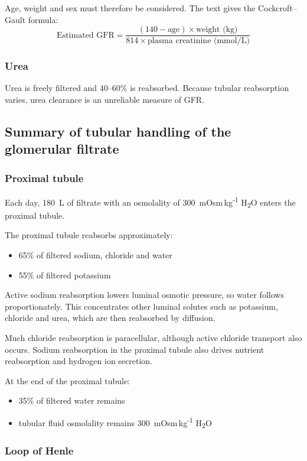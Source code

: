 \documentclass[11pt,a4paper]{article}
\begin{document}
Age, weight and sex must therefore be considered. The text gives the Cockcroft--Gault formula:
\[
\text{Estimated GFR} = \frac{(140 - \text{age}) \times \text{weight (kg)}}{814 \times \text{plasma creatinine (mmol/L)}}
\]

\subsubsection{Urea}

Urea is freely filtered and 40--60\% is reabsorbed. Because tubular reabsorption varies, urea clearance is an unreliable measure of GFR.

\subsection{Summary of tubular handling of the glomerular filtrate}

\subsubsection{Proximal tubule}

Each day, 180~L of filtrate with an osmolality of 300~mOsm\,kg\textsuperscript{-1} H\textsubscript{2}O enters the proximal tubule.

The proximal tubule reabsorbs approximately:
\begin{itemize}
    \item 65\% of filtered sodium, chloride and water
    \item 55\% of filtered potassium
\end{itemize}

Active sodium reabsorption lowers luminal osmotic pressure, so water follows proportionately. This concentrates other luminal solutes such as potassium, chloride and urea, which are then reabsorbed by diffusion.

Much chloride reabsorption is paracellular, although active chloride transport also occurs. Sodium reabsorption in the proximal tubule also drives nutrient reabsorption and hydrogen ion secretion.

At the end of the proximal tubule:
\begin{itemize}
    \item 35\% of filtered water remains
    \item tubular fluid osmolality remains 300~mOsm\,kg\textsuperscript{-1} H\textsubscript{2}O
\end{itemize}

\subsubsection{Loop of Henle}
\end{document}
